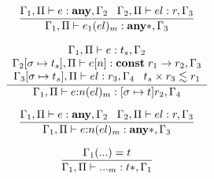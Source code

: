 \[
\dfrac{\Gamma_{1}, \Pi \vdash e:\mathbf{any}, \Gamma_{2} \;\;\;
       \Gamma_{2}, \Pi \vdash el:r, \Gamma_{3}}
      {\Gamma_{1}, \Pi \vdash e_{1}(el)_{m}:\mathbf{any}{*}, \Gamma_{3}}
\]

\[
\dfrac{\begin{array}{c}
       \Gamma_{1}, \Pi \vdash e:t_{s}, \Gamma_{2}\\
       \Gamma_{2}[\sigma \mapsto t_{s}], \Pi \vdash e[n]:\mathbf{const} \; r_{1} \rightarrow r_{2}, \Gamma_{3}\\
       \Gamma_{3}[\sigma \mapsto t_{s}], \Pi \vdash el:r_{3}, \Gamma_{4} \;\;\;
       t_{s} \times r_{3} \lesssim r_{1}
       \end{array}}
      {\Gamma_{1}, \Pi \vdash e{:}n(el)_{m}:[\sigma \mapsto t]r_{2}, \Gamma_{4}}
\]

\[
\dfrac{\Gamma_{1}, \Pi \vdash e:\mathbf{any}, \Gamma_{2} \;\;\;
       \Gamma_{2}, \Pi \vdash el:r, \Gamma_{3}}
      {\Gamma_{1}, \Pi \vdash e{:}n(el)_{m}:\mathbf{any}{*}, \Gamma_{3}}
\]

\[
\dfrac{\Gamma_{1}({...}) = t}
      {\Gamma_{1}, \Pi \vdash {...}_{m}:t{*}, \Gamma_{1}}
\]

